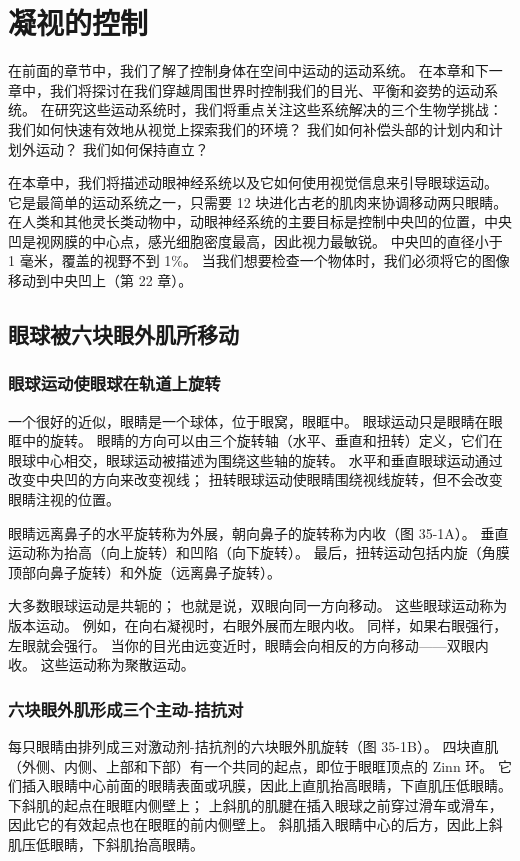 \chapter{凝视的控制}

在前面的章节中，我们了解了控制身体在空间中运动的运动系统。 在本章和下一章中，我们将探讨在我们穿越周围世界时控制我们的目光、平衡和姿势的运动系统。 在研究这些运动系统时，我们将重点关注这些系统解决的三个生物学挑战：我们如何快速有效地从视觉上探索我们的环境？ 我们如何补偿头部的计划内和计划外运动？ 我们如何保持直立？

在本章中，我们将描述动眼神经系统以及它如何使用视觉信息来引导眼球运动。 它是最简单的运动系统之一，只需要 12 块进化古老的肌肉来协调移动两只眼睛。 在人类和其他灵长类动物中，动眼神经系统的主要目标是控制中央凹的位置，中央凹是视网膜的中心点，感光细胞密度最高，因此视力最敏锐。 中央凹的直径小于 1 毫米，覆盖的视野不到 1\%。 当我们想要检查一个物体时，我们必须将它的图像移动到中央凹上（第 22 章）。

\section{眼球被六块眼外肌所移动}
\subsection{眼球运动使眼球在轨道上旋转}
一个很好的近似，眼睛是一个球体，位于眼窝，眼眶中。 眼球运动只是眼睛在眼眶中的旋转。 眼睛的方向可以由三个旋转轴（水平、垂直和扭转）定义，它们在眼球中心相交，眼球运动被描述为围绕这些轴的旋转。 水平和垂直眼球运动通过改变中央凹的方向来改变视线； 扭转眼球运动使眼睛围绕视线旋转，但不会改变眼睛注视的位置。

眼睛远离鼻子的水平旋转称为外展，朝向鼻子的旋转称为内收（图 35-1A）。 垂直运动称为抬高（向上旋转）和凹陷（向下旋转）。 最后，扭转运动包括内旋（角膜顶部向鼻子旋转）和外旋（远离鼻子旋转）。

大多数眼球运动是共轭的； 也就是说，双眼向同一方向移动。 这些眼球运动称为版本运动。 例如，在向右凝视时，右眼外展而左眼内收。 同样，如果右眼强行，左眼就会强行。 当你的目光由远变近时，眼睛会向相反的方向移动——双眼内收。 这些运动称为聚散运动。

\subsection{六块眼外肌形成三个主动-拮抗对}
每只眼睛由排列成三对激动剂-拮抗剂的六块眼外肌旋转（图 35-1B）。 四块直肌（外侧、内侧、上部和下部）有一个共同的起点，即位于眼眶顶点的 Zinn 环。 它们插入眼睛中心前面的眼睛表面或巩膜，因此上直肌抬高眼睛，下直肌压低眼睛。 下斜肌的起点在眼眶内侧壁上； 上斜肌的肌腱在插入眼球之前穿过滑车或滑车，因此它的有效起点也在眼眶的前内侧壁上。 斜肌插入眼睛中心的后方，因此上斜肌压低眼睛，下斜肌抬高眼睛。

